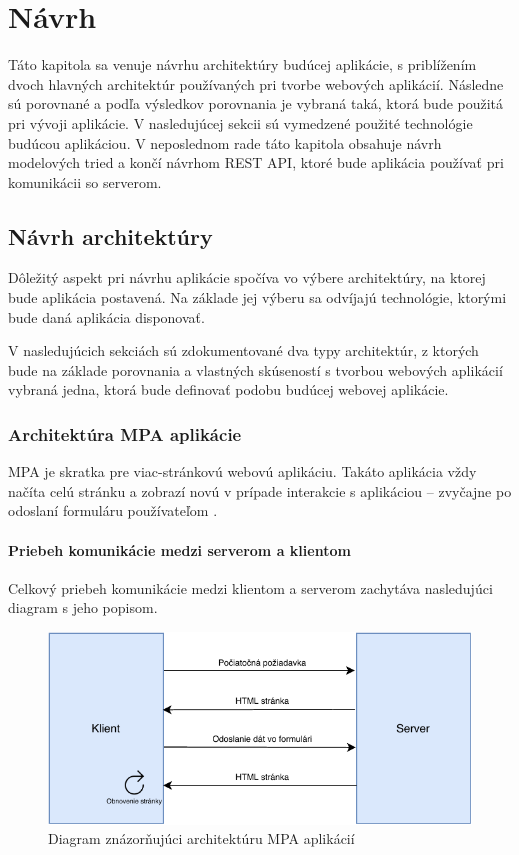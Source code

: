 \chapter{Návrh}
Táto kapitola sa venuje návrhu architektúry budúcej aplikácie, s priblížením dvoch hlavných architektúr používaných pri tvorbe webových aplikácií. Následne sú porovnané a podľa výsledkov porovnania je vybraná taká, ktorá bude použitá pri vývoji aplikácie. V nasledujúcej sekcii sú vymedzené použité technológie budúcou aplikáciou. V neposlednom rade táto kapitola obsahuje návrh modelových tried a končí návrhom REST API, ktoré bude aplikácia používať pri komunikácii so serverom.

\section{Návrh architektúry}
Dôležitý aspekt pri návrhu aplikácie spočíva vo výbere architektúry, na ktorej bude aplikácia postavená. Na základe jej výberu sa odvíjajú technológie, ktorými bude daná aplikácia disponovať.

V nasledujúcich sekciách sú zdokumentované dva typy architektúr, z ktorých bude na základe porovnania a vlastných skúseností s tvorbou webových aplikácií vybraná jedna, ktorá bude definovať podobu budúcej webovej aplikácie.

\subsection{Architektúra MPA aplikácie}
MPA je skratka pre viac-stránkovú webovú aplikáciu. Takáto aplikácia vždy načíta celú stránku a zobrazí novú v prípade  interakcie s aplikáciou -- zvyčajne po odoslaní formuláru používateľom \cite{spa-vs-mpa-1}.

\subsubsection*{Priebeh komunikácie medzi serverom a klientom}
Celkový priebeh komunikácie medzi klientom a serverom zachytáva nasledujúci diagram s jeho popisom.

\begin{figure}
	\includegraphics[width=1.0\textwidth]{media/navrh/MPA.pdf}
	\caption{Diagram znázorňujúci architektúru MPA aplikácií}\label{mpa-graf}
\end{figure}

